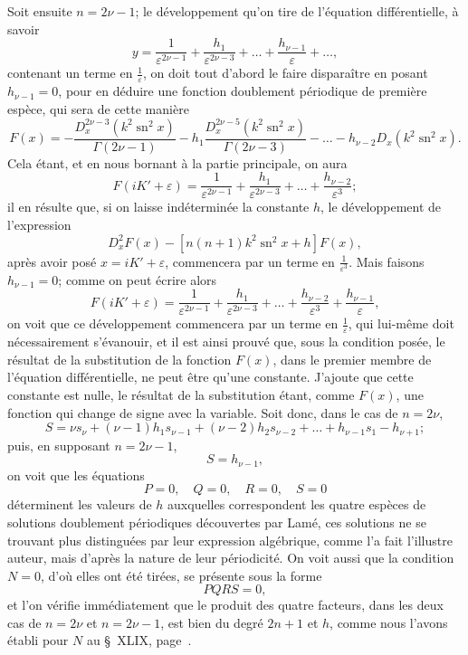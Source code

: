 \documentclass[11pt,leqno,oneside,letterpaper]{book}[2005/09/16]
\DeclareMathOperator{\sn}{sn}
\begin{document}
Soit ensuite $n=2\nu-1$; le d\'eveloppement qu'on tire de l'\'equation
diff\'erentielle, \`a savoir
\[
y = \frac{1}{\varepsilon^{2\nu-1}} + \frac{h_1}{\varepsilon^{2\nu-3}} + \ldots
  + \frac{h_{\nu-1}}{\varepsilon} + \ldots,
\]
contenant un terme en $\frac{1}{\varepsilon}$, on doit tout d'abord le faire dispara\^itre en posant
$h_{\nu-1} = 0$, pour en d\'eduire une fonction doublement p\'eriodique de
premi\`ere esp\`ece, qui sera de cette mani\`ere
\[
F(x) =  -\frac{D_x^{2\nu-3} (k^2 \sn^2 x)}{\Gamma(2\nu-1)}
  -h_1\frac{D_x^{2\nu-5} (k^2 \sn^2 x)}{\Gamma(2\nu-3)} - \ldots
  -h_{\nu-2}D_x          (k^2 \sn^2 x).
\]
Cela \'etant, et en nous bornant \`a la partie principale, on aura
\[
F(iK' + \varepsilon) =
    \frac{1}{\varepsilon^{2\nu-1}}
  + \frac{h_1}{\varepsilon^{2\nu-3}} + \ldots
  + \frac{h_{\nu-2}}{\varepsilon^3};
\]
il en r\'esulte que, si on laisse ind\'etermin\'ee la constante $h$, le d\'eveloppement
de l'expression
\[
D_x^2 F(x) - \left[ n(n+1)k^2 \sn^2 x + h \right] F(x),
\]
apr\`es avoir pos\'e $x=iK'+\varepsilon$, commencera par un terme en $\frac{1}{\varepsilon^3}$. Mais faisons
$h_{\nu-1} = 0$; comme on peut \'ecrire alors
\[
F(iK' + \varepsilon) =
    \frac{1}{\varepsilon^{2\nu-1}}
  + \frac{h_1}{\varepsilon^{2\nu-3}} + \ldots
  + \frac{h_{\nu-2}}{\varepsilon^3}
  + \frac{h_{\nu-1}}{\varepsilon},
\]
on voit que ce d\'eveloppement commencera par un terme en $\frac{1}{\varepsilon}$, qui lui-m\^eme
doit n\'ecessairement s'\'evanouir, et il est ainsi prouv\'e que, sous la
condition pos\'ee, le r\'esultat de la substitution de la fonction $F(x)$, dans le
premier membre de l'\'equation diff\'erentielle, ne peut \^etre qu'une constante.
J'ajoute que cette constante est nulle, le r\'esultat de la substitution \'etant,
comme $F(x)$, une fonction qui change de signe avec la variable. Soit
donc, dans le cas de $n = 2\nu$,
\[
S = \nu s_{\nu} + (\nu-1) h_1 s_{\nu-1} + (\nu-2) h_2 s_{\nu-2} + \ldots
  + h_{\nu-1} s_1 - h_{\nu+1};
\]
puis, en supposant $n = 2\nu-1$,
\[
S = h_{\nu-1},
\]
on voit que les \'equations
\[
P = 0, \quad Q = 0, \quad R = 0, \quad S=0
\]
d\'eterminent les valeurs de $h$ auxquelles correspondent les quatre esp\`eces
de solutions doublement p\'eriodiques d\'ecouvertes par Lam\'e, ces solutions
ne se trouvant plus distingu\'ees par leur expression alg\'ebrique, comme l'a
fait l'illustre auteur, mais d'apr\`es la nature de leur p\'eriodicit\'e. On voit
aussi que la condition $N = 0$, d'o\`u elles ont \'et\'e tir\'ees, se pr\'esente sous la
forme
\[
PQRS = 0,
\]
et l'on v\'erifie imm\'ediatement que le produit des quatre facteurs, dans les
deux cas de $n = 2\nu$ et $n = 2\nu-1$, est bien du degr\'e $2n+1$ et $h$, comme
nous l'avons \'etabli pour $N$ au \S~XLIX, page~\pageref{page133a}.
\end{document}
